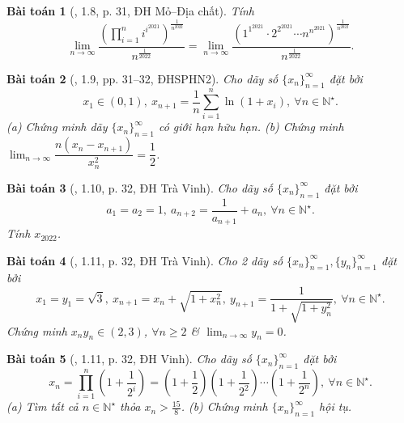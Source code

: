 \documentclass[oneside]{book}
\newtheorem{baitoan}{Bài toán}
\begin{document}
\begin{baitoan}[\cite{VMS_VMC2023}, 1.8, p. 31, ĐH Mỏ--Địa chất]
	Tính
	\begin{equation*}
		\lim_{n\to\infty} \frac{\left(\prod_{i=1}^n i^{i^{2021}}\right)^{\frac{1}{n^{2022}}}}{n^{\frac{1}{2022}}} = \lim_{n\to\infty} \frac{\left(1^{1^{2021}}\cdot2^{2^{2021}}\cdots n^{n^{2021}}\right)^{\frac{1}{n^{2022}}}}{n^{\frac{1}{2022}}}.
	\end{equation*}
\end{baitoan}

\begin{baitoan}[\cite{VMS_VMC2023}, 1.9, pp. 31--32, ĐHSPHN2]
	Cho dãy số $\{x_n\}_{n=1}^\infty$ đặt bởi
	\begin{equation*}
		x_1\in(0,1),\ x_{n+1} = \frac{1}{n}\sum_{i=1}^n \ln(1 + x_i),\ \forall n\in\mathbb{N}^\star.
	\end{equation*}
	(a) Chứng minh dãy $\{x_n\}_{n=1}^\infty$ có giới hạn hữu hạn. (b) Chứng minh $\lim_{n\to\infty} \dfrac{n(x_n - x_{n+1})}{x_n^2} = \dfrac{1}{2}$.
\end{baitoan}

\begin{baitoan}[\cite{VMS_VMC2023}, 1.10, p. 32, ĐH Trà Vinh]
	Cho dãy số $\{x_n\}_{n=1}^\infty$ đặt bởi
	\begin{equation*}
		a_1 = a_2 = 1,\ a_{n+2} = \frac{1}{a_{n+1}} + a_n,\ \forall n\in\mathbb{N}^\star.
	\end{equation*}
	Tính $x_{2022}$.
\end{baitoan}

\begin{baitoan}[\cite{VMS_VMC2023}, 1.11, p. 32, ĐH Trà Vinh]
	Cho 2 dãy số $\{x_n\}_{n=1}^\infty,\{y_n\}_{n=1}^\infty$ đặt bởi
	\begin{equation*}
		x_1 = y_1 = \sqrt{3},\ x_{n+1} = x_n + \sqrt{1 + x_n^2},\ y_{n+1} = \frac{1}{1 + \sqrt{1 + y_n^2}},\ \forall n\in\mathbb{N}^\star.
	\end{equation*}
	Chứng minh $x_ny_n\in(2,3)$, $\forall n\ge2$ \& $\lim_{n\to\infty} y_n = 0$.
\end{baitoan}

\begin{baitoan}[\cite{VMS_VMC2023}, 1.11, p. 32, ĐH Vinh]
	Cho dãy số $\{x_n\}_{n=1}^\infty$ đặt bởi
	\begin{equation*}
		x_n = \prod_{i=1}^n \left(1 + \frac{1}{2^i}\right) = \left(1 + \frac{1}{2}\right)\left(1 + \frac{1}{2^2}\right)\cdots\left(1 + \frac{1}{2^n}\right),\ \forall n\in\mathbb{N}^\star.
	\end{equation*}
	(a) Tìm tất cả $n\in\mathbb{N}^\star$ thỏa $x_n > \frac{15}{8}$. (b) Chứng minh $\{x_n\}_{n=1}^\infty$ hội tụ.
\end{baitoan}
\end{document}
